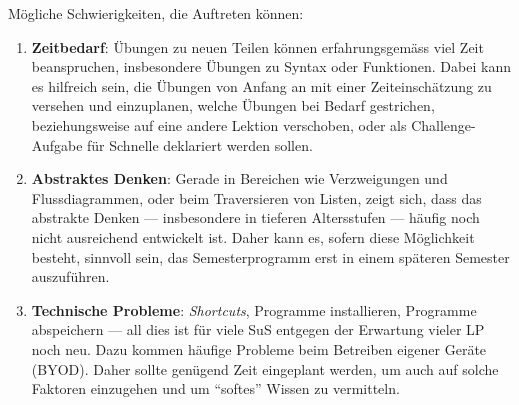 Mögliche Schwierigkeiten, die Auftreten können:
\begin{enumerate}
\item \textbf{Zeitbedarf}: Übungen zu neuen Teilen können erfahrungsgemäss viel Zeit beanspruchen, insbesondere Übungen zu Syntax oder Funktionen. Dabei kann es hilfreich sein, die Übungen von Anfang an mit einer Zeiteinschätzung zu versehen und einzuplanen, welche Übungen bei Bedarf gestrichen, beziehungsweise auf eine andere Lektion verschoben, oder als Challenge-Aufgabe für Schnelle deklariert werden sollen.
\item \textbf{Abstraktes Denken}: Gerade in Bereichen wie Verzweigungen und Flussdiagrammen, oder beim Traversieren von Listen, zeigt sich, dass das abstrakte Denken --- insbesondere in tieferen Altersstufen --- häufig noch nicht ausreichend entwickelt ist. Daher kann es, sofern diese Möglichkeit besteht, sinnvoll sein, das Semesterprogramm erst in einem späteren Semester auszuführen.
\item \textbf{Technische Probleme}: \textit{Shortcuts}, Programme installieren, Programme abspeichern --- all dies ist für viele SuS entgegen der Erwartung vieler LP noch neu. Dazu kommen häufige Probleme beim Betreiben eigener Geräte (BYOD). Daher sollte genügend Zeit eingeplant werden, um auch auf solche Faktoren einzugehen und um \enquote{softes} Wissen zu vermitteln.
\end{enumerate}

\clearpage
\tableofcontents
\clearpage
